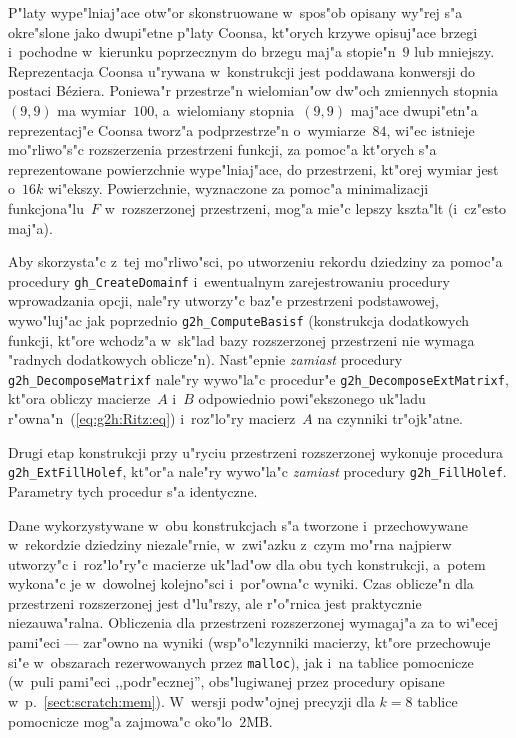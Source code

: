 P"laty wype"lniaj"ace otw"or skonstruowane w~spos"ob opisany wy"rej s"a
okre"slone jako dwupi"etne p"laty Coonsa, kt"orych krzywe opisuj"ace
brzegi i~pochodne w~kierunku poprzecznym do brzegu maj"a stopie"n~$9$
lub mniejszy. Reprezentacja Coonsa u"rywana w~konstrukcji jest poddawana
konwersji do postaci B\'{e}ziera. Poniewa"r przes\-trze"n wielomian"ow dw"och
zmiennych stopnia~$(9,9)$ ma wymiar~$100$, a~wielomiany stopnia~$(9,9)$
maj"ace dwupi"etn"a reprezentacj"e Coonsa tworz"a podprzestrze"n
o~wymiarze~$84$, wi"ec istnieje mo"rliwo"s"c rozszerzenia przestrzeni
funkcji, za pomoc"a kt"orych s"a reprezentowane powierzchnie wype"lniaj"ace,
do przestrzeni, kt"orej wymiar jest o~$16k$ wi"ekszy. Powierzchnie, wyznaczone
za pomoc"a minimalizacji funkcjona"lu~$F$ w~rozszerzonej przestrzeni,
mog"a mie"c lepszy kszta"lt (i~cz"esto maj"a).

Aby skorzysta"c z~tej mo"rliwo"sci, po utworzeniu rekordu dziedziny
za pomoc"a procedury \texttt{gh\_CreateDomainf} i~ewentualnym
zarejestrowaniu procedury wprowadzania opcji, nale"ry utworzy"c baz"e
przestrzeni podstawowej, wywo"luj"ac jak poprzednio \texttt{g2h\_ComputeBasisf}
(konstrukcja dodatkowych funkcji, kt"ore wchodz"a w~sk"lad bazy rozszerzonej
przestrzeni nie wymaga "radnych dodatkowych oblicze"n). Nast"epnie
\emph{zamiast} procedury \texttt{g2h\_DecomposeMatrixf} nale"ry wywo"la"c
procedur"e \texttt{g2h\_DecomposeExtMatrixf}, kt"ora obliczy macierze~$A$
i~$B$ odpowiednio powi"ekszonego uk"ladu r"owna"n~(\ref{eq:g2h:Ritz:eq})
i~roz"lo"ry macierz~$A$ na czynniki tr"ojk"atne.

Drugi etap konstrukcji przy u"ryciu przestrzeni rozszerzonej wykonuje
procedura \texttt{g2h\_ExtFillHolef}, kt"or"a nale"ry wywo"la"c \emph{zamiast}
procedury \texttt{g2h\_FillHolef}. Parametry tych procedur s"a identyczne.

Dane wykorzystywane w~obu konstrukcjach s"a tworzone i~przechowywane
w~rekordzie dziedziny niezale"rnie, w~zwi"azku z~czym mo"rna najpierw
utworzy"c i~roz"lo"ry"c macierze uk"lad"ow dla obu tych konstrukcji,
a~potem wykona"c je w~dowolnej kolejno"sci i~por"owna"c wyniki.
Czas oblicze"n dla przestrzeni rozszerzonej jest d"lu"rszy, ale r"o"rnica
jest praktycznie niezauwa"ralna. Obliczenia dla przestrzeni rozszerzonej
wymagaj"a za to wi"ecej pami"eci --- zar"owno na wyniki (wsp"o"lczynniki
macierzy, kt"ore przechowuje si"e w~obszarach rezerwowanych przez
\texttt{malloc}), jak i~na tablice pomocnicze (w~puli pami"eci ,,podr"ecznej'',
obs"lugiwanej przez procedury opisane w~p.~\ref{sect:scratch:mem}).
W~wersji podw"ojnej precyzji dla $k=8$ tablice pomocnicze mog"a zajmowa"c
oko"lo~$2$MB.

